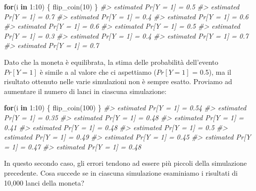 \documentclass[
  10pt,
  italian,
  a4paper,
  extrafontsizes,onecolumn,openright
  ]{memoir}
\newenvironment{Shaded}{\begin{snugshade}}{\end{snugshade}}
\newcommand{\CommentTok}[1]{\textcolor[rgb]{0.56,0.35,0.01}{\textit{#1}}}
\newcommand{\ControlFlowTok}[1]{\textcolor[rgb]{0.13,0.29,0.53}{\textbf{#1}}}
\newcommand{\DecValTok}[1]{\textcolor[rgb]{0.00,0.00,0.81}{#1}}
\newcommand{\FunctionTok}[1]{\textcolor[rgb]{0.00,0.00,0.00}{#1}}
\newcommand{\NormalTok}[1]{#1}
\newcommand{\SpecialCharTok}[1]{\textcolor[rgb]{0.00,0.00,0.00}{#1}}
\theoremstyle{definition}
\theoremstyle{definition}
\theoremstyle{definition}
\theoremstyle{definition}
\theoremstyle{remark}
\begin{document}
\begin{Shaded}
\begin{Highlighting}[]
\ControlFlowTok{for}\NormalTok{(i }\ControlFlowTok{in} \DecValTok{1}\SpecialCharTok{:}\DecValTok{10}\NormalTok{) \{}
  \FunctionTok{flip\_coin}\NormalTok{(}\DecValTok{10}\NormalTok{)}
\NormalTok{\}}
\CommentTok{\#\textgreater{} estimated Pr[Y = 1] = 0.5 }
\CommentTok{\#\textgreater{} estimated Pr[Y = 1] = 0.7 }
\CommentTok{\#\textgreater{} estimated Pr[Y = 1] = 0.4 }
\CommentTok{\#\textgreater{} estimated Pr[Y = 1] = 0.6 }
\CommentTok{\#\textgreater{} estimated Pr[Y = 1] = 0.6 }
\CommentTok{\#\textgreater{} estimated Pr[Y = 1] = 0.5 }
\CommentTok{\#\textgreater{} estimated Pr[Y = 1] = 0.3 }
\CommentTok{\#\textgreater{} estimated Pr[Y = 1] = 0.4 }
\CommentTok{\#\textgreater{} estimated Pr[Y = 1] = 0.7 }
\CommentTok{\#\textgreater{} estimated Pr[Y = 1] = 0.7}
\end{Highlighting}
\end{Shaded}

\noindent
Dato che la moneta è equilibrata, la stima delle probabilità dell'evento \(Pr[Y = 1]\) è simile a al valore che ci aspettiamo (\(Pr[Y = 1]\) = 0.5), ma il risultato ottenuto nelle varie simulazioni non è sempre esatto. Proviamo ad aumentare il numero di lanci in ciascuna simulazione:

\begin{Shaded}
\begin{Highlighting}[]
\ControlFlowTok{for}\NormalTok{(i }\ControlFlowTok{in} \DecValTok{1}\SpecialCharTok{:}\DecValTok{10}\NormalTok{) \{}
  \FunctionTok{flip\_coin}\NormalTok{(}\DecValTok{100}\NormalTok{)}
\NormalTok{\}}
\CommentTok{\#\textgreater{} estimated Pr[Y = 1] = 0.54 }
\CommentTok{\#\textgreater{} estimated Pr[Y = 1] = 0.35 }
\CommentTok{\#\textgreater{} estimated Pr[Y = 1] = 0.48 }
\CommentTok{\#\textgreater{} estimated Pr[Y = 1] = 0.41 }
\CommentTok{\#\textgreater{} estimated Pr[Y = 1] = 0.48 }
\CommentTok{\#\textgreater{} estimated Pr[Y = 1] = 0.5 }
\CommentTok{\#\textgreater{} estimated Pr[Y = 1] = 0.49 }
\CommentTok{\#\textgreater{} estimated Pr[Y = 1] = 0.45 }
\CommentTok{\#\textgreater{} estimated Pr[Y = 1] = 0.47 }
\CommentTok{\#\textgreater{} estimated Pr[Y = 1] = 0.48}
\end{Highlighting}
\end{Shaded}

\noindent
In questo secondo caso, gli errori tendono ad essere più piccoli della simulazione precedente. Cosa succede se in ciascuna simulazione esaminiamo i risultati di 10,000 lanci della moneta?
\end{document}

